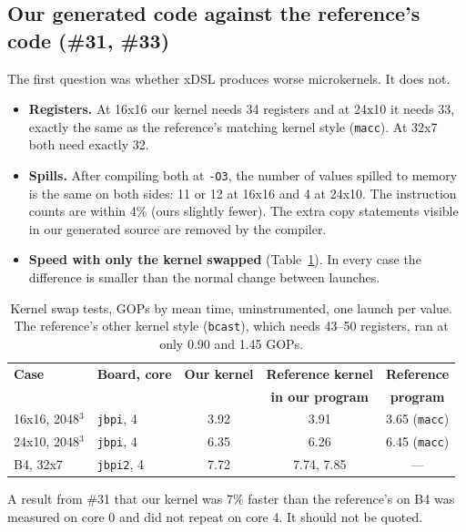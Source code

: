 \documentclass[11pt,a4paper]{article}
\begin{document}
\subsection{Our generated code against the reference's code (\#31, \#33)}
The first question was whether xDSL produces worse microkernels. It does not.
\begin{itemize}
  \item \textbf{Registers.} At 16x16 our kernel needs 34 registers and at 24x10 it needs 33, exactly the same as
  the reference's matching kernel style (\texttt{macc}). At 32x7 both need exactly 32.
  \item \textbf{Spills.} After compiling both at \texttt{-O3}, the number of values spilled to memory is the same
  on both sides: 11 or 12 at 16x16 and 4 at 24x10. The instruction counts are within 4\% (ours slightly
  fewer). The extra copy statements visible in our generated source are removed by the compiler.
  \item \textbf{Speed with only the kernel swapped} (Table~\ref{tab:swap}). In every case the difference is
  smaller than the normal change between launches.
\end{itemize}

\begin{table}[h]
\centering\small
\begin{tabular}{@{}llccc@{}}
\toprule
\textbf{Case} & \textbf{Board, core} & \textbf{Our kernel} & \textbf{Reference kernel} & \textbf{Reference} \\
 & & & \textbf{in our program} & \textbf{program} \\
\midrule
16x16, 2048$^3$ & \texttt{jbpi}, 4 & 3.92 & 3.91 & 3.65 (\texttt{macc}) \\
24x10, 2048$^3$ & \texttt{jbpi}, 4 & 6.35 & 6.26 & 6.45 (\texttt{macc}) \\
B4, 32x7 & \texttt{jbpi2}, 4 & 7.72 & 7.74, 7.85 & --- \\
\bottomrule
\end{tabular}
\caption{Kernel swap tests, GOPs by mean time, uninstrumented, one launch per value. The reference's other kernel
style (\texttt{bcast}), which needs 43--50 registers, ran at only 0.90 and 1.45 GOPs.}
\label{tab:swap}
\end{table}

A result from \#31 that our kernel was 7\% faster than the reference's on B4 was measured on core 0 and did not
repeat on core 4. It should not be quoted.
\end{document}
